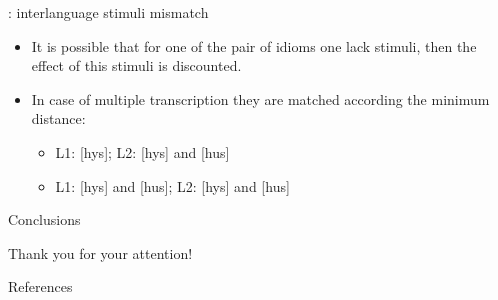 \documentclass[
  ignorenonframetext,
]{beamer}
\newif\ifbibliography
\providecommand{\tightlist}{%
  \setlength{\itemsep}{0pt}\setlength{\parskip}{0pt}}
\begin{document}
\begin{frame}{\citep{heeringa04}: interlanguage stimuli mismatch}
\protect\hypertarget{heeringa04-interlanguage-stimuli-mismatch}{}
\begin{itemize}
\tightlist
\item
  It is possible that for one of the pair of idioms one lack stimuli,
  then the effect of this stimuli is discounted.
\item
  In case of multiple transcription they are matched according the
  minimum distance:

  \begin{itemize}
  \tightlist
  \item
    L1: {[}hys{]}; L2: {[}hys{]} and {[}hus{]}
  \item
    L1: {[}hys{]} and {[}hus{]}; L2: {[}hys{]} and {[}hus{]}
  \end{itemize}
\end{itemize}
\end{frame}

\begin{frame}{\citep{eden18}}
\protect\hypertarget{eden18}{}
\end{frame}

\begin{frame}{Conclusions}
\protect\hypertarget{conclusions-1}{}
\end{frame}

\begin{frame}{}
\protect\hypertarget{section}{}
\LARGE Thank you for your attention!
\end{frame}

\renewcommand\refname{References}
\begin{frame}[allowframebreaks]{References}
  \bibliographytrue
  
\end{frame}
\end{document}
